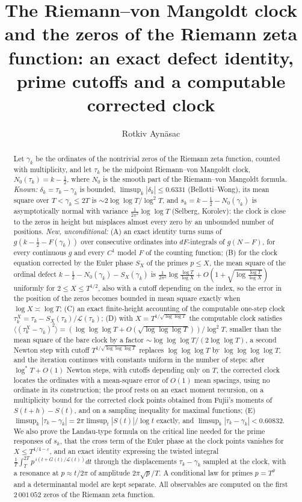 \documentclass[preprint,12pt]{elsarticle}
\numberwithin{equation}{section}
\theoremstyle{plain}
\theoremstyle{definition}
\theoremstyle{remark}
\newcommand{\NO}{N_0}
\newcommand{\lL}{\mathcal L}
\begin{document}
\begin{frontmatter}
\title{The Riemann--von Mangoldt clock and the zeros of the Riemann zeta function: an exact defect identity, prime cutoffs and a computable corrected clock}
\author{Rotkiv Ayn\"asac}

\begin{abstract}
Let $\gamma_k$ be the ordinates of the nontrivial zeros of the Riemann zeta function, counted with multiplicity, and let $\tau_k$ be the midpoint Riemann--von Mangoldt clock, $\NO(\tau_k)=k-\frac12$, where $\NO$ is the smooth part of the Riemann--von Mangoldt formula. \emph{Known:} $\delta_k=\tau_k-\gamma_k$ is bounded, $\limsup_k|\delta_k|\le0.6331$ (Bellotti--Wong), its mean square over $T<\gamma_k\le2T$ is $\sim2\log\log T/\log^2T$, and $s_k=k-\frac12-\NO(\gamma_k)$ is asymptotically normal with variance $\frac1{2\pi^2}\log\log T$ (Selberg, Korolev): the clock is close to the zeros in height but misplaces almost every zero by an unbounded number of positions. \emph{New, unconditional:} (A) an exact identity turns sums of $g(k-\frac12-F(\gamma_k))$ over consecutive ordinates into $dF$-integrals of $g(N-F)$, for every continuous $g$ and every $C^1$ model $F$ of the counting function; (B) for the clock equation corrected by the Euler phase $S_X$ of the primes $p\le X$, the mean square of the ordinal defect $k-\frac12-\NO(\gamma_k)-S_X(\gamma_k)$ is $\frac1{2\pi^2}\log\frac{\log T}{\log X}+O(1+\sqrt{\log\frac{\log T}{\log X}})$ uniformly for $2\le X\le T^{1/2}$, also with a cutoff depending on the index, so the error in the position of the zeros becomes bounded in mean square exactly when $\log X\asymp\log T$; (C) an exact finite-height accounting of the computable one-step clock $\tau_k^X=\tau_k-S_X(\tau_k)/\lL(\tau_k)$; (D) with $X=T^{1/\sqrt{\log\log T}}$ the computable clock satisfies $\langle(\tau_k^X-\gamma_k)^2\rangle=(\log\log\log T+O(\sqrt{\log\log\log T}))/\log^2T$, smaller than the mean square of the bare clock by a factor $\sim\log\log\log T/(2\log\log T)$, a second Newton step with cutoff $T^{1/\sqrt{\log\log\log T}}$ replaces $\log\log\log T$ by $\log\log\log\log T$, and the iteration continues with constants uniform in the number of steps: after $\log^*T+O(1)$ Newton steps, with cutoffs depending only on $T$, the corrected clock locates the ordinates with a mean-square error of $O(1)$ mean spacings, using no ordinate in its construction; the proof rests on an exact moment recursion, on a multiplicity bound for the corrected clock points obtained from Fujii's moments of $S(t+h)-S(t)$, and on a sampling inequality for maximal functions; (E) $\limsup_k|\tau_k-\gamma_k|=2\pi\limsup_t|S(t)|/\log t$ exactly, and $\limsup_k|\tau_k-\gamma_k|<0.60832$. We also prove the Landau-type formula on the critical line needed for the prime responses of $s_k$, that the cross term of the Euler phase at the clock points vanishes for $X\le T^{1/4-\varepsilon}$, and an exact identity expressing the twisted integral $\frac1T\int_T^{2T}p^{\,i(t+G(t)/\lL(t))}dt$ through the displacements $\tau_k-\gamma_k$ sampled at the clock, with a resonance at $p\approx t/2\pi$ of amplitude $2\pi\sqrt p/T$. A conditional law for primes $p=T^\theta$ and a determinantal model are kept separate. All observables are computed on the first $2\,001\,052$ zeros of the Riemann zeta function.

\end{abstract}
\end{frontmatter}
\end{document}
